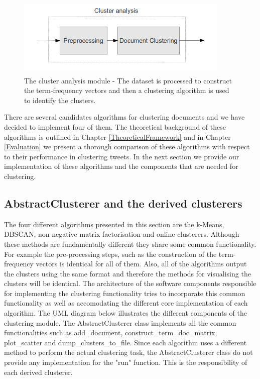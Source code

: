 \begin{figure}[htbp]
  \begin{center}
    \includegraphics[height=1.5in, width=4in]{clustering-overview}
    \caption{The cluster analysis module - The dataset is processed to construct the term-frequency vectors and then a clustering algorithm is used to identify the clusters.}
    \label{ClusteringOverview}
  \end{center}
\end{figure} 

There are several candidates algorithms for clustering documents and we have decided to implement four of them. The theoretical background of these algorithms is outlined in Chapter \ref{TheoreticalFramework} and in Chapter \ref{Evaluation} we present a thorough comparison of these algorithms with respect to their performance in clustering tweets.  
In the next section we provide our implementation of these algorithms and the components that are needed for clustering. 

\subsection{AbstractClusterer and the derived clusterers}
The four different algorithms presented in this section are the k-Means, DBSCAN, non-negative matrix factorisation and online clusterers. Although these methods are fundamentally different they share some common functionality. For example the pre-processing steps, such as the construction of the term-frequency vectors is identical for all of them. Also, all of the algorithms output the clusters using the same format and therefore the methods for visualising the clusters will be identical. The architecture of the software components responsible for implementing the clustering functionality tries to incorporate this common functionality as well as accomodating the different core implementation of each algorithm. The UML diagram below illustrates the different components of the clustering module. The AbstractClusterer class implements all the common functionalities such as add\_document, construct\_term\_doc\_matrix, plot\_scatter and dump\_clusters\_to\_file. Since each algorithm uses a different method to perform the actual clustering task, the AbstractClusterer class do not provide any implementation for the "run" function. This is the responsibility of each derived clusterer. 

